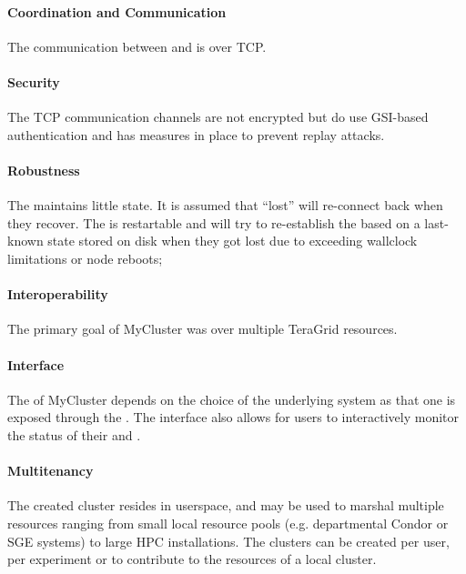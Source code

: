 \documentclass{sig-alternate}
\begin{document}
\paragraph{Coordination and Communication}

The communication between  and 
is over TCP.

\paragraph{Security}

The TCP communication channels are not encrypted but do use GSI-based
authentication and has measures in place to prevent replay attacks.

\paragraph{Robustness}

The  maintains little state. It is assumed that ``lost''
 will re-connect back when they recover.
The  is restartable and will try to re-establish the
 based on a last-known state stored on disk when they got
lost due to exceeding wallclock limitations or node reboots;

\paragraph{Interoperability}

The primary goal of MyCluster was  over multiple
TeraGrid resources.

\paragraph{Interface}

The  of MyCluster depends on the choice of the underlying
system as that one is exposed through the . The interface also allows for users to interactively monitor the status
of their \vocab{\pilots} and .

\paragraph{Multitenancy}

The created cluster resides in userspace, and may be used to marshal multiple
resources ranging from small local resource pools (e.g.  departmental Condor or
SGE systems) to large HPC installations. The clusters can be created per user,
per experiment or to contribute to the resources of a local cluster.
\end{document}
